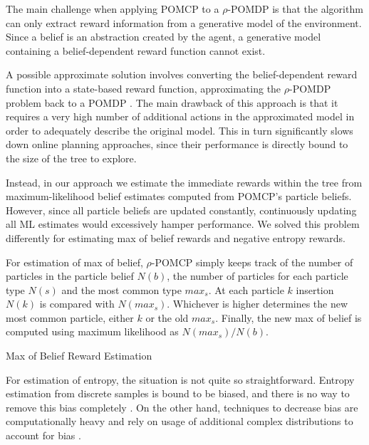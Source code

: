 The main challenge when applying POMCP to a $\rho$-POMDP is that the algorithm can only extract
reward information from a generative model of the environment. Since a belief is an abstraction
created by the agent, a generative model containing a belief-dependent reward function cannot exist.

A possible approximate solution involves converting the belief-dependent reward function into a
state-based reward function, approximating the $\rho$-POMDP problem back to a POMDP \cite{cit:rpomdp}.
The main drawback of this approach is that it requires a very high number of additional actions in
the approximated model in order to adequately describe the original model. This in turn
significantly slows down online planning approaches, since their performance is directly bound to
the size of the tree to explore.

Instead, in our approach we estimate the immediate rewards within the tree from maximum-likelihood
belief estimates computed from POMCP's particle beliefs. However, since all particle beliefs are
updated constantly, continuously updating all ML estimates would excessively hamper performance. We
solved this problem differently for estimating max of belief rewards and negative entropy rewards.

For estimation of max of belief, $\rho$-POMCP simply keeps track of the number of particles in the
particle belief $N(b)$, the number of particles for each particle type $N(s)$ and the most common
type $max_s$. At each particle $k$ insertion $N(k)$ is compared with $N(max_s)$. Whichever is higher
determines the new most common particle, either $k$ or the old $max_s$. Finally, the new max of
belief is computed using maximum likelihood as $N(max_s)/N(b)$.

\begin{algorithm}[H]
    \caption{Max of Belief Reward Estimation}

\end{algorithm}

For estimation of entropy, the situation is not quite so straightforward. Entropy estimation from
discrete samples is bound to be biased, and there is no way to remove this bias completely
\cite{cit:badentropy}. On the other hand, techniques to decrease bias are computationally heavy and
rely on usage of additional complex distributions to account for bias \cite{cit:entropyfixes}.

